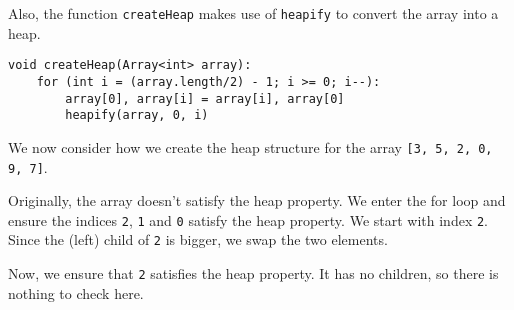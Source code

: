 \documentclass[a4paper, openany]{memoir}
\begin{document}
\noindent Also, the function \texttt{createHeap} makes use of \texttt{heapify} to convert the array into a heap.
\begin{lstlisting}[language=pseudocode]
void createHeap(Array<int> array):
    for (int i = (array.length/2) - 1; i >= 0; i--):
        array[0], array[i] = array[i], array[0]
        heapify(array, 0, i)
\end{lstlisting}
We now consider how we create the heap structure for the array \texttt{[3, 5, 2, 0, 9, 7]}.
\begin{center}
\end{center}
Originally, the array doesn't satisfy the heap property. We enter the for loop and ensure the indices \texttt{2}, \texttt{1} and \texttt{0} satisfy the heap property. We start with index \texttt{2}. Since the (left) child of \texttt{2} is bigger, we swap the two elements.
\begin{center}
\end{center}
Now, we ensure that \texttt{2} satisfies the heap property. It has no children, so there is nothing to check here.
\end{document}
